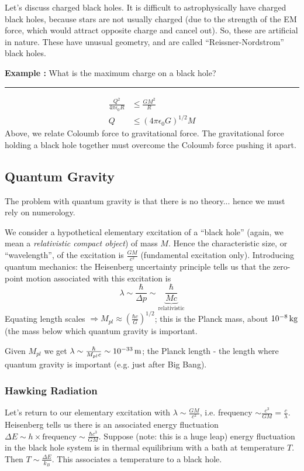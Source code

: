 \documentclass[a4paper]{article} %
\newcommand{\example}[2]
{
\begin{framed}
\textbf{Example #1:} #2
\end{framed}
}
\begin{document}
Let's discuss charged black holes. It is difficult to astrophysically have charged black holes, because stars are not usually charged (due to the strength of the EM force, which would attract opposite charge and cancel out). So, these are artificial in nature. These have unusual geometry, and are called ``Reissner-Nordstrom'' black holes.
\example{}{What is the maximum charge on a black hole?\\\hrule
\begin{align*}
\frac{Q^2}{4\pi\epsilon_0 R}&\leq \frac{GM^2}{R}\\
Q&\leq (4\pi\epsilon_0 G)^{1/2} M
\end{align*}
Above, we relate Coloumb force to gravitational force. The gravitational force holding a black hole together must overcome the Coloumb force pushing it apart.
}

\subsection{Quantum Gravity}
The problem with quantum gravity is that there is no theory... hence we must rely on numerology.

We consider a hypothetical elementary excitation of a ``black hole'' (again, we mean a \emph{relativistic compact object}) of mass $M$. Hence the characteristic size, or ``wavelength'', of the excitation is $\frac{GM}{c^2}$ (fundamental excitation only). Introducing quantum mechanics: the Heisenberg uncertainty principle tells us that the zero-point motion associated with this excitation is
\begin{equation}
\lambda\sim\frac{\hbar}{\Delta p}\sim \underbrace{\frac{\hbar}{Mc}}_{\text{relativistic}}
\end{equation}
Equating length scales $\Rightarrow M_{pl}\approx \left(\frac{\hbar c}{G}\right)^{1/2}$; this is the Planck mass, about $\SI{d-8}{kg}$ (the mass below which quantum gravity is important. 

Given $M_{pl}$ we get $\lambda\sim\frac{\hbar}{M_{pl}c}\sim \SI{d-33}{m}$; the Planck length - the length where quantum gravity is important (e.g. just after Big Bang).

\subsubsection{Hawking Radiation}
Let's return to our elementary excitation with $\lambda\sim\frac{GM}{c^2}$, i.e. frequency $\sim \frac{c^3}{GM}=\frac{c}{\lambda}$. Heisenberg tells us there is an associated energy fluctuation $\Delta E\sim h\times\text{frequency}\sim\frac{\hbar c^3}{GM}$. Suppose (note: this is a huge leap) energy fluctuation in the black hole system is in thermal equilibrium with a bath at temperature $T$. Then $T\sim\frac{\Delta E}{k_B}$. This associates a temperature to a black hole.
\end{document}
